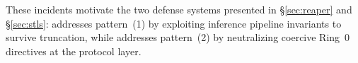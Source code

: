 These incidents motivate the two defense systems presented in \S\ref{sec:reaper} and \S\ref{sec:stls}: \reaper{} addresses pattern~(1) by exploiting inference pipeline invariants to survive truncation, while \stls{} addresses pattern~(2) by neutralizing coercive Ring~0 directives at the protocol layer.
